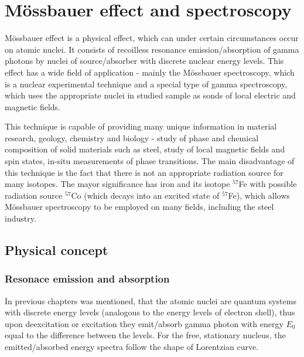 
\chapter{Mössbauer effect and spectroscopy}
Mössbauer effect is a physical effect, which can under certain circumstances occur on atomic nuclei. It consists of recoilless resonance emission/absorption of gamma photons by nuclei of source/absorber with discrete nuclear energy levels. This effect has a wide field of application - mainly the Mössbauer spectroscopy, which is a nuclear experimental technique and a special type of gamma spectroscopy, which uses the appropriate nuclei in studied sample as sonds of local electric and magnetic fields. 

\par
This technique is capable of providing many unique information in material research, geology, chemistry and biology - study of phase and chemical composition of solid materials such as steel, study of local magnetic fields and spin states, in-situ measurements of phase transitions. The main disadvantage of this technique is the fact that there is not an appropriate radiation source for many isotopes. The mayor significance has iron and its isotope $^{57}$Fe with possible radiation source $^{57}$Co (which decays into an excited state of $^{57}$Fe), which allows Mössbauer spectroscopy to be employed on many fields, including the steel industry.

\section{Physical concept}

\subsection{Resonace emission and absorption}
In previous chapters was mentioned, that the atomic nuclei are quantum systems with discrete energy levels (analogous to the energy levels of electron shell), thus upon deexcitation or excitation they emit/absorb gamma photon with energy $E_0$ equal to the difference between the levels. For the free, stationary nucleus, the emitted/absorbed energy spectra follow the shape of Lorentzian curve. 

